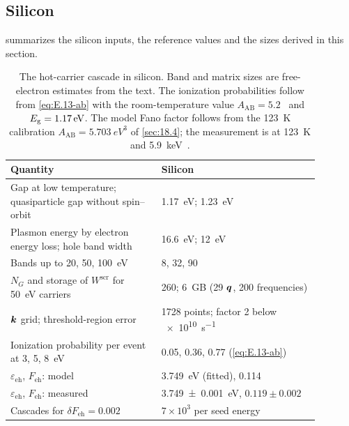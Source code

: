 \subsection{Silicon}

 summarizes the silicon inputs, the reference values and the sizes derived in this section.

\begin{table}[t]
  \caption{The hot-carrier cascade in silicon. Band and matrix sizes are free-electron estimates from the text. The ionization probabilities follow from \cref{eq:E.13-ab} with the room-temperature value $A_{\mathrm{AB}} = 5.2$~\cite{ramanathan2020ionization} and $E_{\mathrm{g}} = \SI{1.17}{eV}$. The model Fano factor follows from the \SI{123}{K} calibration $A_{\mathrm{AB}} = \SI{5.703}{eV^3}$ of \cref{sec:18.4}; the measurement is at \SI{123}{K} and \SI{5.9}{keV}~\cite{rodrigues2021absolute}.}
  \label{tab:E-cascade-si}
  \centering
  \begin{tabular}{p{0.43\linewidth}p{0.45\linewidth}}
    \toprule
    Quantity & Silicon \\
    \midrule
    Gap at low temperature; quasiparticle gap without spin--orbit & \SI{1.17}{eV}; \SI{1.23}{eV}~\cite{kotani2010impact} \\
    Plasmon energy by electron energy loss; hole band width & \SI{16.6}{eV}; \SI{12}{eV}~\cite{ramanathan2020ionization} \\
    Bands up to 20, 50, \SI{100}{eV} & 8, 32, 90 \\
    $N_G$ and storage of $W^{\mathrm{scr}}$ for \SI{50}{eV} carriers & 260; \SI{6}{GB} (29 $\bm{q}$, 200 frequencies) \\
    $\bm{k}$ grid; threshold-region error & 1728 points; factor 2 below \SI{e10}{s^{-1}}~\cite{kotani2010impact} \\
    Ionization probability per event at 3, 5, \SI{8}{eV} & 0.05, 0.36, 0.77 (\cref{eq:E.13-ab}) \\
    $\varepsilon_{\mathrm{eh}}$, $F_{\mathrm{eh}}$: model & \SI{3.749}{eV} (fitted), 0.114 \\
    $\varepsilon_{\mathrm{eh}}$, $F_{\mathrm{eh}}$: measured & \SI{3.749 \pm 0.001}{eV}, $0.119 \pm 0.002$ \\
    Cascades for $\delta F_{\mathrm{eh}} = 0.002$ & $7\times10^3$ per seed energy \\
    \bottomrule
  \end{tabular}
\end{table}
